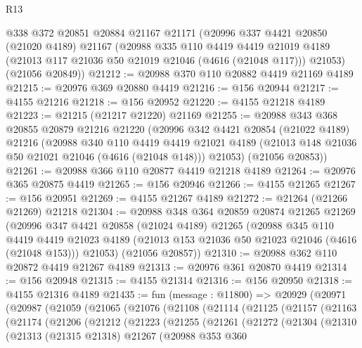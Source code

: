 \begin{lexlean}{R13}
\begin{coremodule}
    @338
    @372
    @20851
    @20884
    @21167
    @21171
    (@20996
      @337
      @4421
      @20850
      (@21020 @4189)
      @21167
      (@20988
        @335
        @110
        @4419
        @4419
        @21019
        @4189
        (@21013 @117 @21036 @50 @21019 @21046 (@4616 (@21048 @117)))
        @21053)
      (@21056 @20849))
@21212 := @20988 @370 @110 @20882 @4419 @21169 @4189
@21215 := @20976 @369 @20880 @4419
@21216 := @156 @20944
@21217 := @4155 @21216
@21218 := @156 @20952
@21220 := @4155 @21218 @4189
@21223 := @21215 (@21217 @21220) @21169
@21255 := @20988
    @343
    @368
    @20855
    @20879
    @21216
    @21220
    (@20996
      @342
      @4421
      @20854
      (@21022 @4189)
      @21216
      (@20988
        @340
        @110
        @4419
        @4419
        @21021
        @4189
        (@21013 @148 @21036 @50 @21021 @21046 (@4616 (@21048 @148)))
        @21053)
      (@21056 @20853))
@21261 := @20988 @366 @110 @20877 @4419 @21218 @4189
@21264 := @20976 @365 @20875 @4419
@21265 := @156 @20946
@21266 := @4155 @21265
@21267 := @156 @20951
@21269 := @4155 @21267 @4189
@21272 := @21264 (@21266 @21269) @21218
@21304 := @20988
    @348
    @364
    @20859
    @20874
    @21265
    @21269
    (@20996
      @347
      @4421
      @20858
      (@21024 @4189)
      @21265
      (@20988
        @345
        @110
        @4419
        @4419
        @21023
        @4189
        (@21013 @153 @21036 @50 @21023 @21046 (@4616 (@21048 @153)))
        @21053)
      (@21056 @20857))
@21310 := @20988 @362 @110 @20872 @4419 @21267 @4189
@21313 := @20976 @361 @20870 @4419
@21314 := @156 @20948
@21315 := @4155 @21314
@21316 := @156 @20950
@21318 := @4155 @21316 @4189
@21435 := fun (message : @11800) =>
  @20929
    (@20971
      (@20987
        (@21059
          (@21065
            (@21076
              (@21108
                (@21114
                  (@21125
                    (@21157
                      (@21163
                        (@21174
                          (@21206
                            (@21212
                              (@21223
                                (@21255
                                  (@21261
                                    (@21272
                                      (@21304
                                        (@21310
                                          (@21313
                                            (@21315 @21318)
                                            @21267
                                            (@20988
                                              @353
                                              @360

\end{coremodule}
\end{lexlean}

